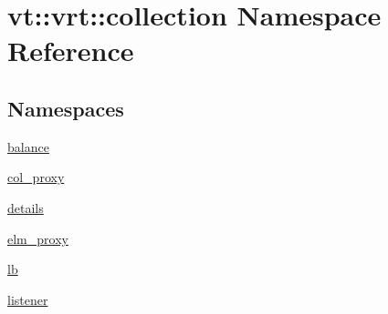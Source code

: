 \hypertarget{namespacevt_1_1vrt_1_1collection}{}\section{vt\+:\+:vrt\+:\+:collection Namespace Reference}
\label{namespacevt_1_1vrt_1_1collection}
\subsection*{Namespaces}
\begin{DoxyCompactItemize}
\item 
 \hyperlink{namespacevt_1_1vrt_1_1collection_1_1balance}{balance}
\item 
 \hyperlink{namespacevt_1_1vrt_1_1collection_1_1col__proxy}{col\+\_\+proxy}
\item 
 \hyperlink{namespacevt_1_1vrt_1_1collection_1_1details}{details}
\item 
 \hyperlink{namespacevt_1_1vrt_1_1collection_1_1elm__proxy}{elm\+\_\+proxy}
\item 
 \hyperlink{namespacevt_1_1vrt_1_1collection_1_1lb}{lb}
\item 
 \hyperlink{namespacevt_1_1vrt_1_1collection_1_1listener}{listener}
\end{DoxyCompactItemize}
